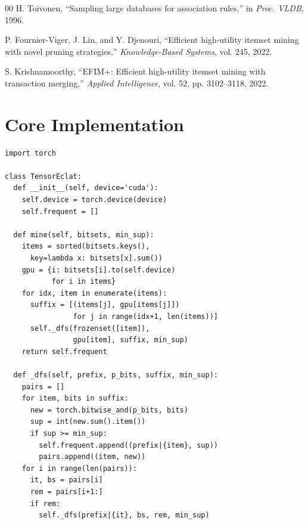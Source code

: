 \documentclass[conference]{IEEEtran}
\begin{document}
\begin{thebibliography}{00}
H. Toivonen, ``Sampling large databases for association rules,'' in \textit{Proc. VLDB}, 1996.

P. Fournier-Viger, J. Lin, and Y. Djenouri, ``Efficient high-utility itemset mining with novel pruning strategies,'' \textit{Knowledge-Based Systems}, vol. 245, 2022.

S. Krishnamoorthy, ``EFIM+: Efficient high-utility itemset mining with transaction merging,'' \textit{Applied Intelligence}, vol. 52, pp. 3102--3118, 2022.

\end{thebibliography}

\appendices
\section{Core Implementation}
\begin{verbatim}
import torch

class TensorEclat:
  def __init__(self, device='cuda'):
    self.device = torch.device(device)
    self.frequent = []

  def mine(self, bitsets, min_sup):
    items = sorted(bitsets.keys(),
      key=lambda x: bitsets[x].sum())
    gpu = {i: bitsets[i].to(self.device)
           for i in items}
    for idx, item in enumerate(items):
      suffix = [(items[j], gpu[items[j]])
                for j in range(idx+1, len(items))]
      self._dfs(frozenset([item]),
                gpu[item], suffix, min_sup)
    return self.frequent

  def _dfs(self, prefix, p_bits, suffix, min_sup):
    pairs = []
    for item, bits in suffix:
      new = torch.bitwise_and(p_bits, bits)
      sup = int(new.sum().item())
      if sup >= min_sup:
        self.frequent.append((prefix|{item}, sup))
        pairs.append((item, new))
    for i in range(len(pairs)):
      it, bs = pairs[i]
      rem = pairs[i+1:]
      if rem:
        self._dfs(prefix|{it}, bs, rem, min_sup)
\end{verbatim}
\end{document}
